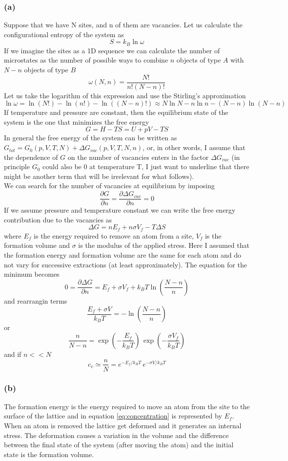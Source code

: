 \documentclass{article}
\begin{document}
\subsubsection*{(a)}
Suppose that we have N sites, and n of them are vacancies. Let us calculate the configurational entropy of the system as
$$S = k_B \ln\omega$$
If we imagine the sites as a 1D sequence we can calculate the number of microstates as the number of possible ways to 
combine $n$ objects of type $A$ with $N-n$ objects of type $B$
$$\omega(N, n) = \frac{N!}{n!(N-n)!}$$
Let us take the logarithm of this expression and use the Stirling's approximation
$$\ln \omega = \ln(N!) - \ln(n!) - \ln((N-n)!) \approx N \ln N - n \ln n - (N-n)\ln(N-n)$$
If temperature and pressure are constant, then the equilibrium state of the system is the one that minimizes the free energy
$$G = H - TS = U + pV - TS$$
In general the free energy of the system can be written as $G_{tot} = G_0(p, V, T, N) + \Delta G_{vac}(p, V, T, N, n)$, or,
in other words, I assume that the dependence of $G$ on the number of vacancies enters in the factor $\Delta G_{vac}$ (in principle $G_0$ could also be 0 at temperature T, I just want to underline that there might be another term that will be irrelevant for what follows). \\
We can search for the number of vacancies at equilibrium by imposing $$\frac{\partial G}{\partial n} = \frac{\partial \Delta G_{vac}}{\partial n} = 0$$
If we assume pressure and temperature constant we can write the free energy contribution due to the vacancies as
$$\Delta G = nE_f + n\sigma V_f- T\Delta S$$ 
where $E_f$ is the energy required to remove an atom from a site, $V_f$ is the formation volume and $\sigma$ is the modulus of the applied stress. Here I assumed that the formation energy and formation volume are the same for each atom 
and do not vary for successive extractions (at least approximately). The equation for the minimum becomes
$$ 0 = \frac{\partial \Delta G}{\partial n} = E_f + \sigma V_f + k_BT\ln\left(\frac{N-n}{n}\right)$$
and rearrangin terms
$$\frac{E_f + \sigma V}{k_BT} = -\ln\left(\frac{N-n}{n}\right)$$
or
$$\frac{n}{N-n} = \exp\left(-\frac{E_f}{k_B T}\right) \, \exp\left(-\frac{\sigma V_f}{k_B T}\right)$$
and if $n << N$
\begin{equation}
    c_v \simeq \frac{n}{N} = e^{-E_f/k_B T} \, e^{-\sigma V/k_B T}
    \label{eq:concentration}
\end{equation}

\subsubsection*{(b)}
The formation energy is the energy required to move an atom from the site to the surface of the lattice and in equation \ref{eq:concentration} is represented by $E_f$.
When an atom is removed the lattice get deformed and it generates an internal stress. The deformation causes a variation in the volume and the difference between the final state of the 
system (after moving the atom) and the initial state is the formation volume.
\end{document}
